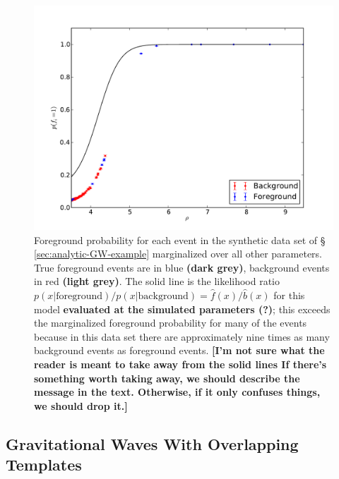 \documentclass[aps,prd]{revtex4-1}
\newcommand{\ilya}[1]{{\color{red} \bf #1}}
\begin{document}
\begin{figure}
  \includegraphics[width=\columnwidth]{pfore}
  \caption{\label{fig:analytic-rate-foreground-probs} Foreground
    probability for each event in the synthetic data set of \S
    \ref{sec:analytic-GW-example} marginalized over all other
    parameters.  True foreground events are in blue \ilya{(dark
      grey)}, background events in red \ilya{(light grey)}.  The solid
    line is the likelihood ratio
    $p(x|\mathrm{foreground})/p(x|\mathrm{background}) =
    \hat{f}(x)/\hat{b}(x)$ for this model \ilya{evaluated at the
      simulated parameters (?)}; this exceeds the marginalized
    foreground probability for many of the events because in this data
    set there are approximately nine times as many background events
    as foreground events. \ilya{[I'm not sure what the reader is meant
        to take away from the solid lines If there's something worth
        taking away, we should describe the message in the text.
        Otherwise, if it only confuses things, we should drop it.]}}
\end{figure}

\subsection{Gravitational Waves With Overlapping Templates}
\label{sec:gw-overlapping-template}
\end{document}
